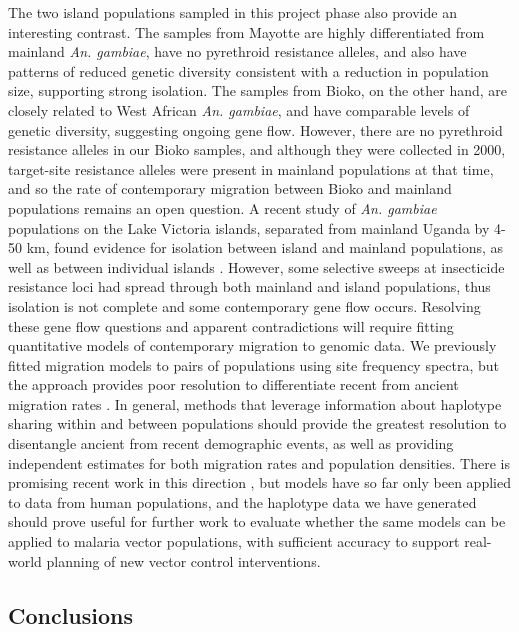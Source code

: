 \documentclass[a4paper,11pt,abstracton,hidelinks]{scrartcl}
\begin{document}
The two island populations sampled in this project phase also provide an interesting contrast.
%
The samples from Mayotte are highly differentiated from mainland \textit{An. gambiae}, have no pyrethroid resistance alleles, and also have patterns of reduced genetic diversity consistent with a reduction in population size, supporting strong isolation.
%
The samples from Bioko, on the other hand, are closely related to West African \textit{An. gambiae}, and have comparable levels of genetic diversity, suggesting ongoing gene flow.
%
However, there are no pyrethroid resistance alleles in our Bioko samples, and although they were collected in 2000, target-site resistance alleles were present in mainland populations at that time, and so the rate of contemporary migration between Bioko and mainland populations remains an open question.
%
A recent study of \textit{An. gambiae} populations on the Lake Victoria islands, separated from mainland Uganda by 4-50 km, found evidence for isolation between island and mainland populations, as well as between individual islands \cite{Bergey2019}.
%
However, some selective sweeps at insecticide resistance loci had spread through both mainland and island populations, thus isolation is not complete and some contemporary gene flow occurs.
%
Resolving these gene flow questions and apparent contradictions will require fitting quantitative models of contemporary migration to genomic data.
%
We previously fitted migration models to pairs of populations using site frequency spectra, but the approach provides poor resolution to differentiate recent from ancient migration rates \cite{Ag1000G2017}.
%
In general, methods that leverage information about haplotype sharing within and between populations should provide the greatest resolution to disentangle ancient from recent demographic events, as well as providing independent estimates for both migration rates and population densities.
%
There is promising recent work in this direction \cite{Al-Asadi2019}, but models have so far only been applied to data from human populations, and the haplotype data we have generated should prove useful for further work to evaluate whether the same models can be applied to malaria vector populations, with sufficient accuracy to support real-world planning of new vector control interventions.
%


\subsection*{Conclusions}
\end{document}
